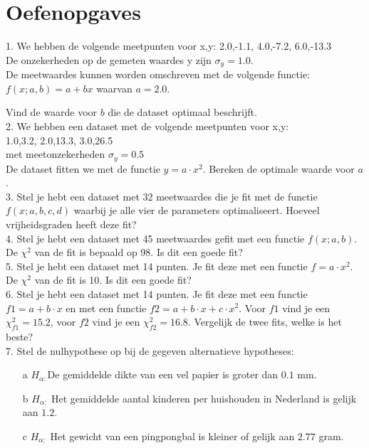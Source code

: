 \section{Oefenopgaves}
\label{/tussentoets-iii/oefenopgaves}



1. We hebben de volgende meetpunten voor {x,y}: 
{2.0,-1.1}, {4.0,-7.2}, {6.0,-13.3}\\
De onzekerheden op de gemeten waardes y zijn $\sigma_y = 1.0$.\\
De meetwaardes kunnen worden omschreven met de volgende functie:\\

$f(x;a,b) = a+bx$ waarvan $a=2.0$. 
  
Vind de waarde voor $b$ die de dataset optimaal beschrijft.\\


2. We hebben een dataset met de volgende meetpunten voor {x,y}:\\
{1.0,3.2}, {2.0,13.3}, {3.0,26.5}\\
met meetonzekerheden $\sigma_y = 0.5$\\
De dataset fitten we met de functie $y = a\cdot x^2$. Bereken de optimale waarde voor $a$.\\


3. Stel je hebt een dataset met 32 meetwaardes die je fit met de functie $f(x;a,b,c,d)$ waarbij je alle vier de parameters optimaliseert. Hoeveel vrijheidsgraden heeft deze fit?\\


4. Stel je hebt een dataset met 45 meetwaardes gefit met een functie $f(x;a,b)$. De $\chi^2$ van de fit is bepaald op 98. Is dit een goede fit?\\


5. Stel je hebt een dataset met 14 punten. Je fit deze met een functie $f=a\cdot x^2$. De $\chi^2$ van de fit is 10. Is dit een goede fit?\\


6. Stel je hebt een dataset met 14 punten. Je fit deze met een functie $f1 = a+ b\cdot x$ en met een functie $f2 = a+b\cdot x+ c\cdot x^2$. Voor $f1$ vind je een $\chi^2_{f1} = 15.2$, voor $f2$ vind je een $\chi^2_{f2} = 16.8$. Vergelijk de twee fits, welke is het beste? \\


7. Stel de nulhypothese op bij de gegeven alternatieve hypotheses:\\
\begin{itemize}
  \item[a] $H_{\alpha:} $De gemiddelde dikte van een vel papier is groter dan $0.1$ mm.
  \item[b] $H_{\alpha:}$ Het gemiddelde aantal kinderen per huishouden in Nederland is gelijk aan $1.2$.
  \item[c] $H_{\alpha:}$ Het gewicht van een pingpongbal is kleiner of gelijk aan $2.77$ gram. 
\end{itemize}


